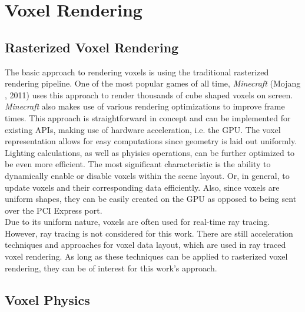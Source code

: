 \section{Voxel Rendering} \label{sec-voxel-rendering}

\subsection*{Rasterized Voxel Rendering} \label{subsec-rasterized-voxel-rendering}

The basic approach to rendering voxels is using the traditional rasterized rendering pipeline.
One of the most popular games of all time, \emph{Minecraft} (Mojang \cite{Mojang2024}, 2011) uses 
this approach to render thousands of cube shaped voxels on screen. \emph{Minecraft} also makes use 
of various rendering optimizations to improve frame times. This approach is straightforward in 
concept and can be implemented for existing \ac{API}s, making use of hardware acceleration, i.e. 
the \ac{GPU}. The voxel representation allows for easy computations since geometry is laid out 
uniformly. Lighting calculations, as well as phyisics operations, can be further optimized to 
be even more efficient. The most significant characteristic is the ability to dynamically enable or 
disable voxels within the scene layout. Or, in general, to update voxels and their corresponding 
data efficiently. Also, since voxels are uniform shapes, they can be easily created on the \ac{GPU} 
as opposed to being sent over the \ac{PCI Express} port. \\

\noindent
Due to its uniform nature, voxels are often used for real-time ray tracing. However, ray tracing 
is not considered for this work. There are still acceleration techniques and approaches for voxel 
data layout, which are used in ray traced voxel rendering. As long as these techniques can be 
applied to rasterized voxel rendering, they can be of interest for this work's approach.


\subsection*{Voxel Physics} \label{subsec-voxel-physics}

